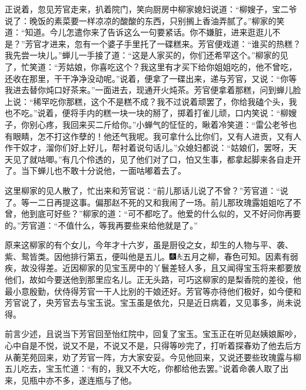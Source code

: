 正说着，忽见芳官走来，扒着院门，笑向厨房中柳家媳妇说道：``柳嫂子，宝二爷说了：晚饭的素菜要一样凉凉的酸酸的东西，只别搁上香油弄腻了。''柳家的笑道：``知道。今儿怎遣你来了告诉这么一句要紧话。你不嫌脏，进来逛逛儿不是？''芳官才进来，忽有一个婆子手里托了一碟糕来。芳官便戏道：``谁买的热糕？我先尝一块儿。''蝉儿一手接了道：``这是人家买的，你们还希罕这个。''柳家的见了，忙笑道：``芳姑娘，你喜吃这个？我这里有才买下给你姐姐吃的，他不曾吃，还收在那里，干干净净没动呢。''说着，便拿了一碟出来，递与芳官，又说：``你等我进去替你炖口好茶来。''一面进去，现通开火炖茶。芳官便拿着那糕，问到蝉儿脸上说：``稀罕吃你那糕，这个不是糕不成？我不过说着顽罢了，你给我磕个头，我也不吃。''说着，便将手内的糕一块一块的掰了，掷着打雀儿顽，口内笑说：``柳嫂子，你别心疼，我回来买二斤给你。''小蝉气的怔怔的，瞅着冷笑道：``雷公老爷也有眼睛，怎不打这作孽的！他还气我呢。我可拿什么比你们，又有人进贡，又有人作干奴才，溜你们好上好儿，帮衬着说句话儿。''众媳妇都说：``姑娘们，罢呀，天天见了就咕唧。''有几个伶透的，见了他们对了口，怕又生事，都拿起脚来各自走开了。当下蝉儿也不敢十分说他，一面咕嘟着去了。

这里柳家的见人散了，忙出来和芳官说：``前儿那话儿说了不曾？''芳官道：``说了。等一二日再提这事。偏那赵不死的又和我闹了一场。前儿那玫瑰露姐姐吃了不曾，他到底可好些？''柳家的道：``可不都吃了。他爱的什么似的，又不好问你再要的。''芳官道：``不值什么，等我再要些来给他就是了。''

原来这柳家的有个女儿，今年才十六岁，虽是厨役之女，却生的人物与平、袭、紫、鸳皆类。因他排行第五，便叫他是五儿。{\includegraphics[width=3mm]{../Images/00004}\includegraphics[width=3mm]{../Images/00012}\footnotesize \kaishu 五月之柳，春色可知。}因素有弱疾，故没得差。近因柳家的见宝玉房中的丫鬟差轻人多，且又闻得宝玉将来都要放他们，故如今要送他到那里应名儿。正无头路，可巧这柳家的是梨香院的差役，他最小意殷勤，伏侍得芳官一干人比别的干娘还好。芳官等亦待他们极好，如今便和芳官说了，央芳官去与宝玉说。宝玉虽是依允，只是近日病着，又见事多，尚未说得。

前言少述，且说当下芳官回至怡红院中，回复了宝玉。宝玉正在听见赵姨娘厮吵，心中自是不悦，说又不是，不说又不是，只得等吵完了，打听着探春劝了他去后方从蘅芜苑回来，劝了芳官一阵，方大家安妥。今见他回来，又说还要些玫瑰露与柳五儿吃去，宝玉忙道：``有的，我又不大吃，你都给他去罢。''说着命袭人取了出来，见瓶中亦不多，遂连瓶与了他。

